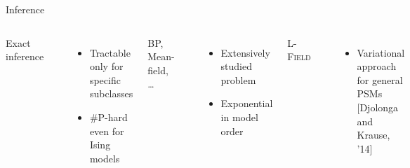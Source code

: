 \documentclass[mathserif]{beamer}
\newcommand{\qcite}[1]{{\scriptsize\color{col2}[#1]}}
\begin{document}
\begin{frame}{Inference}
\vspace{0.5em}
\begin{columns}[c]
\begin{minipage}[t][1.7em]{\textwidth}
\centering
Exact inference
\end{minipage}

\centering
\includegraphics[width=1.4in]{figures/inf01_exact.pdf}

\vspace{1em}
\begin{itemize}
\item \small{Tractable only for specific subclasses}
\vspace{1em}
\item \#P-hard even for Ising models
\end{itemize}

\begin{minipage}[t][1.7em]{\textwidth}
\centering
BP, Mean-field, \ldots
\end{minipage}

\centering
\includegraphics[width=1.4in]{figures/inf02_loworder.pdf}

\vspace{1em}
\begin{itemize}
\item \small{Extensively studied problem}
\vspace{1em}
\item \small{Exponential in model order}
\end{itemize}

\begin{minipage}[t][1.7em]{\textwidth}
\centering
L-\textsc{Field}
\end{minipage}

\centering
\includegraphics[width=1.4in]{figures/inf03_psm.pdf}

\vspace{1em}
\begin{itemize}
\item \small{Variational approach for general PSMs} \qcite{Djolonga and Krause, '14}
\vspace{1.2em}
\end{itemize}
\end{columns}
\end{frame}
\end{document}
